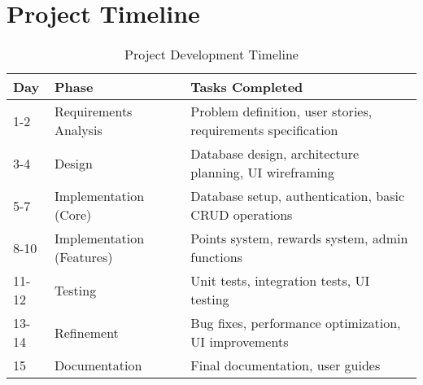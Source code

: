 \documentclass[12pt,a4paper]{report}
\begin{document}
\chapter{Project Timeline}
\begin{table}[H]
    \centering
    \begin{tabular}{|l|l|p{8cm}|}
        \hline
        \textbf{Day} & \textbf{Phase} & \textbf{Tasks Completed} \\
        \hline
        1-2 & Requirements Analysis & Problem definition, user stories, requirements specification \\
        \hline
        3-4 & Design & Database design, architecture planning, UI wireframing \\
        \hline
        5-7 & Implementation (Core) & Database setup, authentication, basic CRUD operations \\
        \hline
        8-10 & Implementation (Features) & Points system, rewards system, admin functions \\
        \hline
        11-12 & Testing & Unit tests, integration tests, UI testing \\
        \hline
        13-14 & Refinement & Bug fixes, performance optimization, UI improvements \\
        \hline
        15 & Documentation & Final documentation, user guides \\
        \hline
    \end{tabular}
    \caption{Project Development Timeline}
    \label{tab:timeline}
\end{table}
\end{document}
